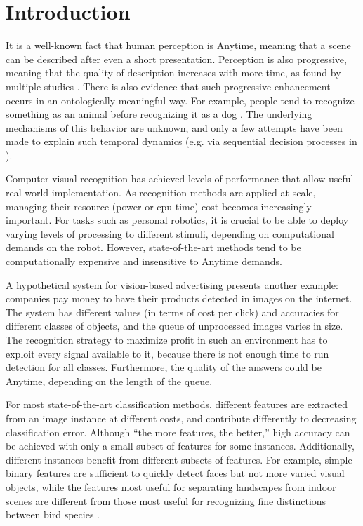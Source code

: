 \chapter{Introduction}\label{sec:introduction}

It is a well-known fact that human perception is Anytime, meaning that a scene can be described after even a short presentation.
Perception is also progressive, meaning that the quality of description increases with more time, as found by multiple studies \parencite{Vanrullen-1996,Fei-Fei-Vision-2007}.
There is also evidence that such progressive enhancement occurs in an ontologically meaningful way.
For example, people tend to recognize something as an animal before recognizing it as a dog \parencite{Mace-PloS-2009}.
The underlying mechanisms of this behavior are unknown, and only a few attempts have been made to explain such temporal dynamics (e.g. via sequential decision processes in \textcite{Hegde-Neuro-2008}).

Computer visual recognition has achieved levels of performance that allow useful real-world implementation.
As recognition methods are applied at scale, managing their resource (power or cpu-time) cost becomes increasingly important.
For tasks such as personal robotics, it is crucial to be able to deploy varying levels of processing to different stimuli, depending on computational demands on the robot.
However, state-of-the-art methods tend to be computationally expensive and insensitive to Anytime demands.

A hypothetical system for vision-based advertising presents another example: companies pay money to have their products detected in images on the internet.
The system has different values (in terms of cost per click) and accuracies for different classes of objects, and the queue of unprocessed images varies in size.
The recognition strategy to maximize profit in such an environment has to exploit every signal available to it, because there is not enough time to run detection for all classes.
Furthermore, the quality of the answers could be Anytime, depending on the length of the queue.

For most state-of-the-art classification methods, different features are extracted from an image instance at different costs, and contribute differently to decreasing classification error.
Although ``the more features, the better,'' high accuracy can be achieved with only a small subset of features for some instances.
Additionally, different instances benefit from different subsets of features.
For example, simple binary features are sufficient to quickly detect faces \parencite{Viola2004} but not more varied visual objects, while the features most useful for separating landscapes from indoor scenes \parencite{Xiao-CVPR-2010} are different from those most useful for recognizing fine distinctions between bird species \parencite{Farrell-ICCV-2011}.


